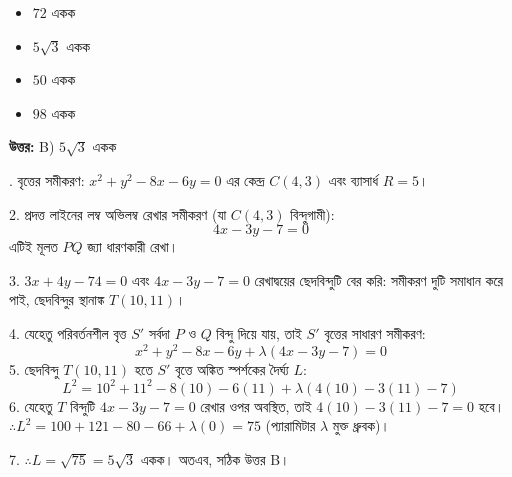\documentclass[12pt, a4paper]{article}
\begin{document}
\begin{itemize}[label={}, leftmargin=1cm, itemsep=0.5em]
    \item[\textbf{A)}] $72$ একক
    \item[\textbf{B)}] $5\sqrt{3}$ একক
    \item[\textbf{C)}] $50$ একক
    \item[\textbf{D)}] $98$ একক
\end{itemize}

\vspace{0.5em}
\begin{tcolorbox}[answerbox]
    \textbf{\color{success} উত্তর:} B) $5\sqrt{3}$ একক
\end{tcolorbox}
\vspace{1em}

\begin{tcolorbox}[solutionbox={সমাধান (Solution)}]
    . বৃত্তের সমীকরণ: $x^2 + y^2 - 8x - 6y = 0$ এর কেন্দ্র $C(4, 3)$ এবং ব্যাসার্ধ $R = 5$।
    
    \vspace{0.5em}
    2. প্রদত্ত লাইনের লম্ব অভিলম্ব রেখার সমীকরণ (যা $C(4, 3)$ বিন্দুগামী):
    \[ 4x - 3y - 7 = 0 \]
    এটিই মূলত $PQ$ জ্যা ধারণকারী রেখা।
    
    3. $3x + 4y - 74 = 0$ এবং $4x - 3y - 7 = 0$ রেখাদ্বয়ের ছেদবিন্দুটি বের করি: সমীকরণ দুটি সমাধান করে পাই, ছেদবিন্দুর স্থানাঙ্ক $T(10, 11)$।
    
    \vspace{0.5em}
    4. যেহেতু পরিবর্তনশীল বৃত্ত $S'$ সর্বদা $P$ ও $Q$ বিন্দু দিয়ে যায়, তাই $S'$ বৃত্তের সাধারণ সমীকরণ:
    \[ x^2 + y^2 - 8x - 6y + \lambda(4x - 3y - 7) = 0 \]
    5. ছেদবিন্দু $T(10, 11)$ হতে $S'$ বৃত্তে অঙ্কিত স্পর্শকের দৈর্ঘ্য $L$:
    \[ L^2 = 10^2 + 11^2 - 8(10) - 6(11) + \lambda(4(10) - 3(11) - 7) \]
    6. যেহেতু $T$ বিন্দুটি $4x - 3y - 7 = 0$ রেখার ওপর অবস্থিত, তাই $4(10) - 3(11) - 7 = 0$ হবে। 
    $\therefore L^2 = 100 + 121 - 80 - 66 + \lambda(0) = 75$ (প্যারামিটার $\lambda$ মুক্ত ধ্রুবক)।
    
    7. $\therefore L = \sqrt{75} = 5\sqrt{3}$ একক।
    অতএব, সঠিক উত্তর B।
\end{tcolorbox}
\end{document}
